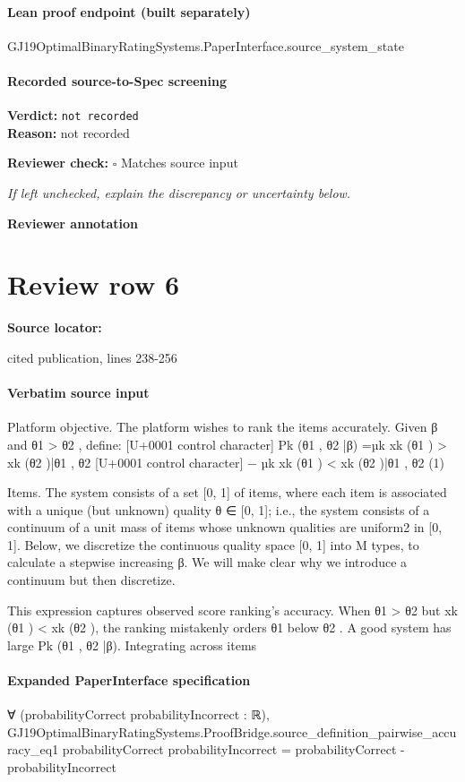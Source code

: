 \documentclass[10pt]{article}
\newcommand{\reviewerbox}{%
  \par\noindent\fbox{\parbox{0.96\linewidth}{\rule{0pt}{0.38in}}}\par
}
\newcommand{\reviewmatch}[1]{%
  \par\noindent\textbf{Reviewer check:} $\square$\; #1\par
  \noindent\emph{If left unchecked, explain the discrepancy or uncertainty below.}\par
}
\begin{document}
\paragraph{Lean proof endpoint (built separately)}\begin{ReviewVerbatim}
GJ19OptimalBinaryRatingSystems.PaperInterface.source_system_state
\end{ReviewVerbatim}

\paragraph{Recorded source-to-Spec screening}
\textbf{Verdict:} \texttt{not recorded}
\\
\textbf{Reason:} not recorded
\reviewmatch{Matches source input}
\noindent\textbf{Reviewer annotation}\par
\reviewerbox
\clearpage
\hypertarget{source-claim-b8da8ea96b79a0b8}{}
\section*{Review row 6}
\textbf{Source locator:} {\footnotesize\raggedright cited publication, lines 238-\allowbreak{}256\par}
\paragraph{Verbatim source input}
\begin{ReviewVerbatim}
Platform objective. The platform wishes to rank
the items accurately. Given β and θ1 > θ2 , define:
[U+0001 control character]
Pk (θ1 , θ2 |β) =µk xk (θ1 ) > xk (θ2 )|θ1 , θ2
[U+0001 control character]
− µk xk (θ1 ) < xk (θ2 )|θ1 , θ2
(1)

Items. The system consists of a set [0, 1] of items,
where each item is associated with a unique (but unknown) quality θ ∈ [0, 1]; i.e., the system consists of
a continuum of a unit mass of items whose unknown
qualities are uniform2 in [0, 1]. Below, we discretize
the continuous quality space [0, 1] into M types, to
calculate a stepwise increasing β. We will make clear
why we introduce a continuum but then discretize.

This expression captures observed score ranking’s
accuracy. When θ1 > θ2 but xk (θ1 ) < xk (θ2 ), the
ranking mistakenly orders θ1 below θ2 . A good system has large Pk (θ1 , θ2 |β). Integrating across items
\end{ReviewVerbatim}


\paragraph{Expanded PaperInterface specification}
\begin{ReviewVerbatim}
∀ (probabilityCorrect probabilityIncorrect : ℝ),
  GJ19OptimalBinaryRatingSystems.ProofBridge.source_definition_pairwise_accuracy_eq1 probabilityCorrect
      probabilityIncorrect =
    probabilityCorrect - probabilityIncorrect
\end{ReviewVerbatim}
\end{document}
